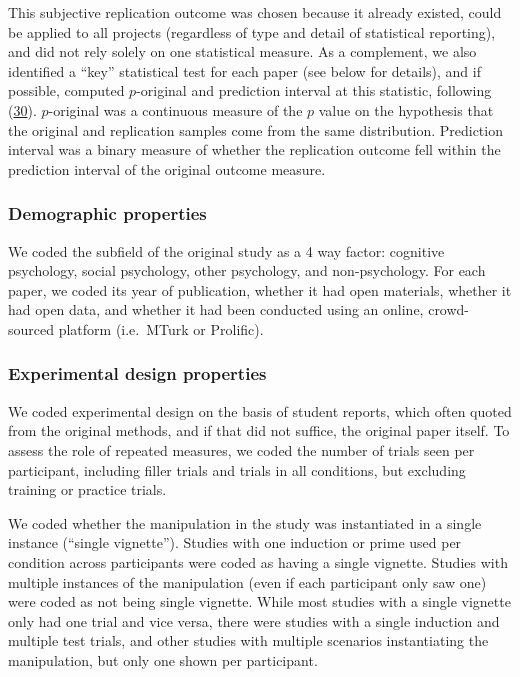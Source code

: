 \documentclass[
  english,
  a4paper,
]{article}
\begin{document}
This subjective replication outcome was chosen because it already existed, could be applied to all projects (regardless of type and detail of statistical reporting), and did not rely solely on one statistical measure. As a complement, we also identified a ``key'' statistical test for each paper (see below for details), and if possible, computed \(p\)-original and prediction interval at this statistic, following (\protect\hyperlink{ref-mathur2020}{30}). \(p\)-original was a continuous measure of the \(p\) value on the hypothesis that the original and replication samples come from the same distribution. Prediction interval was a binary measure of whether the replication outcome fell within the prediction interval of the original outcome measure.

\hypertarget{demographic-properties}{%
\subsubsection{Demographic properties}\label{demographic-properties}}

We coded the subfield of the original study as a 4 way factor: cognitive psychology, social psychology, other psychology, and non-psychology. For each paper, we coded its year of publication, whether it had open materials, whether it had open data, and whether it had been conducted using an online, crowd-sourced platform (i.e.~MTurk or Prolific).

\hypertarget{experimental-design-properties}{%
\subsubsection{Experimental design properties}\label{experimental-design-properties}}

We coded experimental design on the basis of student reports, which often quoted from the original methods, and if that did not suffice, the original paper itself. To assess the role of repeated measures, we coded the number of trials seen per participant, including filler trials and trials in all conditions, but excluding training or practice trials.

We coded whether the manipulation in the study was instantiated in a single instance (``single vignette''). Studies with one induction or prime used per condition across participants were coded as having a single vignette. Studies with multiple instances of the manipulation (even if each participant only saw one) were coded as not being single vignette. While most studies with a single vignette only had one trial and vice versa, there were studies with a single induction and multiple test trials, and other studies with multiple scenarios instantiating the manipulation, but only one shown per participant.
\end{document}
